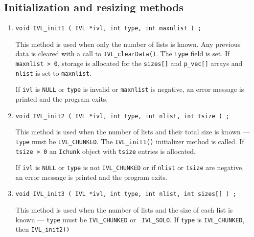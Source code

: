 \subsection{Initialization and resizing methods}
\label{subsection:IVL:proto:initializers}
\par
\begin{enumerate}
\item
\begin{verbatim}
void IVL_init1 ( IVL *ivl, int type, int maxnlist ) ;
\end{verbatim}
This method is used when only the number of lists is known.
Any previous data is cleared with a call to {\tt IVL\_clearData()}.
The {\tt type} field is set.
If {\tt maxnlist > 0},
storage is allocated for the {\tt sizes[]} and {\tt p\_vec[]}
arrays and {\tt nlist} is set to {\tt maxnlist}.
\par {}
If {\tt ivl} is {\tt NULL} or {\tt type} is invalid 
or {\tt maxnlist} is negative, 
an error message is printed and the program exits.
\item
\begin{verbatim}
void IVL_init2 ( IVL *ivl, int type, int nlist, int tsize ) ;
\end{verbatim}
This method is used when the number of lists and their
total size is known --- {\tt type} must be {\tt IVL\_CHUNKED}.
The {\tt IVL\_init1()} initializer method is called.
If {\tt tsize > 0} an {\tt Ichunk} object with {\tt tsize} entries
is allocated.
\par {}
If {\tt ivl} is {\tt NULL} or {\tt type} is not {\tt IVL\_CHUNKED}
or if {\tt nlist} or {\tt tsize} are negative,
an error message is printed and the program exits.
\item
\begin{verbatim}
void IVL_init3 ( IVL *ivl, int type, int nlist, int sizes[] ) ;
\end{verbatim}
This method is used when the number of lists and the size of each
list is known --- {\tt type} must be {\tt IVL\_CHUNKED} or {\tt
IVL\_SOLO}.
If {\tt type} is {\tt IVL\_CHUNKED}, then {\tt IVL\_init2()}

\end{enumerate}
